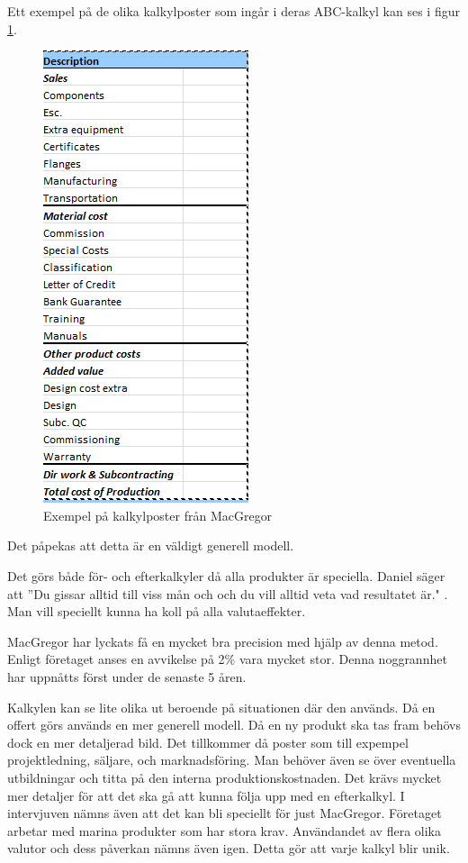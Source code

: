 Ett exempel på de olika kalkylposter som ingår i deras ABC-kalkyl kan ses i figur \ref{fig:abc}.
\begin{figure}[ht]
    \centering
    \includegraphics[scale=.6]{img/abc.png}
    \caption{Exempel på kalkylposter från MacGregor}
    \label{fig:abc}
\end{figure}
Det påpekas att detta är en väldigt generell modell.

Det görs både för- och efterkalkyler då alla produkter är speciella.
Daniel säger att ''Du gissar alltid till viss mån och och du vill alltid veta vad resultatet är." \cite{daniel}.
Man vill speciellt kunna ha koll på alla valutaeffekter.

MacGregor har lyckats få en mycket bra precision med hjälp av denna metod.
Enligt företaget anses en avvikelse på 2\% vara mycket stor.
Denna noggrannhet har uppnåtts först under de senaste 5 åren.

Kalkylen kan se lite olika ut beroende på situationen där den används.
Då en offert görs används en mer generell modell.
Då en ny produkt ska tas fram behövs dock en mer detaljerad bild.
Det tillkommer då poster som till expempel projektledning, säljare, och marknadsföring.
Man behöver även se över eventuella utbildningar och titta på den interna produktionskostnaden.
Det krävs mycket mer detaljer för att det ska gå att kunna följa upp med en efterkalkyl.
I intervjuven nämns även att det kan bli speciellt för just MacGregor.
Företaget arbetar med marina produkter som har stora krav.
Användandet av flera olika valutor och dess påverkan nämns även igen.
Detta gör att varje kalkyl blir unik.


